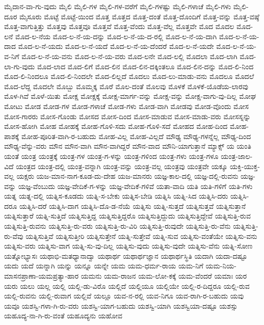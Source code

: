 {ಮೈದಾನ-ವಾ-ಗು-ವುದು
ಮೈಲಿ
ಮೈಲಿ-ಗಳ
ಮೈಲಿ-ಗಳ-ವರೆಗೆ
ಮೈಲಿ-ಗಳಷ್ಟು
ಮೈಲಿ-ಗಳಾಚೆ
ಮೈಲಿ-ಗಳು
ಮೈಲಿ-ದೂರ
ಮೈಸೂರು
ಮೊಟ್ಟೆ
ಮೊಟ್ಟೆ-ಯಿಂದ
ಮೊತ್ತ
ಮೊತ್ತದ
ಮೊತ್ತ-ದಂತೆ
ಮೊತ್ತ-ದೊಂದಿಗೆ
ಮೊತ್ತ-ವನ್ನು
ಮೊತ್ತ-ವಷ್ಠೆ
ಮೊತ್ತ-ವಾಗುತ್ತಿತ್ತು
ಮೊತ್ತವು
ಮೊತ್ತವೂ
ಮೊತ್ತವೆ
ಮೊತ್ತ-ವೆಂದು
ಮೊತ್ತ-ವೆಲ್ಲ
ಮೊತ್ತವೇ
ಮೊದ
ಮೊದಲ
ಮೊದ-ಲನೆ
ಮೊದ-ಲ-ನೆಯ
ಮೊದ-ಲ-ನೆ-ಯ-ದನ್ನು
ಮೊದ-ಲ-ನೆ-ಯ-ದ-ರಲ್ಲಿ
ಮೊದ-ಲ-ನೆ-ಯ-ದಾಗಿ
ಮೊದ-ಲ-ನೆ-ಯ-ದಾದ
ಮೊದ-ಲ-ನೆ-ಯದು
ಮೊದ-ಲ-ನೆ-ಯದೆ
ಮೊದ-ಲ-ನೆ-ಯ-ದೆಂದರೆ
ಮೊದ-ಲ-ನೆ-ಯದೇ
ಮೊದ-ಲ-ನೆ-ಯ-ವ-ನಿಗೆ
ಮೊದ-ಲ-ನೆ-ಯ-ವನು
ಮೊದ-ಲ-ನೆ-ಯ-ವರು
ಮೊದ-ಲನೇ
ಮೊದ-ಲಲ್ಲಿ
ಮೊದಲಾ
ಮೊದ-ಲಾಗಿ
ಮೊದ-ಲಾ-ಗು-ವುದು
ಮೊದ-ಲಾದ
ಮೊದ-ಲಿಗೆ
ಮೊದ-ಲಿನ
ಮೊದ-ಲಿನ-ದಕ್ಕಿಂತಲೂ
ಮೊದ-ಲಿನ-ದನ್ನು
ಮೊದ-ಲಿ-ನಿಂದ
ಮೊದ-ಲಿ-ನಿಂದಲೂ
ಮೊದ-ಲಿ-ನಿಂದಲೇ
ಮೊದ-ಲಿಲ್ಲದೆ
ಮೊದಲು
ಮೊದ-ಲು-ಮಾಡು-ವನು
ಮೊದಲೂ
ಮೊದಲೆ
ಮೊದ-ಲೆದ್ದ
ಮೊದಲೇ
ಮೊಬ್ಬು
ಮೊಮ್ಮಕ್ಕ
ಮೊರೆ
ಮೊಲ-ದಂತೆ
ಮೊಲವು
ಮೊಳಕೆ
ಮೊಳಕೆ-ಯೊಡೆಯ-ಲಾರವು
ಮೊಳ-ಗಿವೆ
ಮೊಳೆ-ಯಿತು
ಮೋಕ್ಷ
ಮೋಕ್ಷಕ್ಕೆ
ಮೋಕ್ಷ-ಮಾರ್ಗ-ವನ್ನು
ಮೋಕ್ಷ-ವನ್ನು
ಮೋಕ್ಷ-ವಾಗು-ವು-ದಿಲ್ಲ
ಮೋಘ
ಮೋಟು
ಮೋಡ
ಮೋಡ-ಗಳ
ಮೋಡ-ಗಳಾಚೆ
ಮೋಡ-ಗಳು
ಮೋಡ-ವಾಗಿ
ಮೋಡವು
ಮೋಡ-ವೊಂದು
ಮೋಸ
ಮೋಸ-ಗಾರರು
ಮೋಸ-ಗೊಂಡು
ಮೋಸದ
ಮೋಸ-ದಿಂದ
ಮೋಸ-ಮಾಡುವ
ಮೋಸ-ಮಾಡು-ವರು
ಮೋಸಸ್ನನ್ನು
ಮೋಸ-ಹೋಗಿ
ಮೋಹ
ಮೋಹಕ್ಕೆ
ಮೋಹ-ಗೊಳಿ-ಸದು
ಮೋಹ-ಗೊಳಿ-ಸದೆ
ಮೋಹದ
ಮೋಹ-ದಿಂದ
ಮೋಹ-ಪಾಶಕ್ಕೆ
ಮೋಹ-ಪೂರಿತ-ವಾಗಿ-ರ-ಬಹುದು
ಮೋಹ-ವಿಲ್ಲ
ಮೋಹ-ವಿಲ್ಲದೆ
ಮೌಢ್ಯ
ಮೌಢ್ಯ-ಗಳನ್ನೆಲ್ಲ
ಮೌಢ್ಯ-ದಿಂದ
ಮೌಢ್ಯ-ವೆನ್ನು-ವರು
ಮೌನ
ಮೌನ-ವಾಗಿ
ಮೌನ-ವಾಗಿದ್ದರೆ
ಮೌನ-ವಾದ
ಮೌನಿ-ಯಾಗುತ್ತಾನೆ
ಮ್ಯಾಕ್ಸ್
ಯ
ಯಂತಿ
ಯಂತೆ
ಯಂತ್ರ
ಯಂತ್ರಕ್ಕೆ
ಯಂತ್ರ-ಗಳ
ಯಂತ್ರ-ಗ-ಳನ್ನು
ಯಂತ್ರ-ಗಳಿಂದ
ಯಂತ್ರ-ಗಳು
ಯಂತ್ರ-ಗಳೂ
ಯಂತ್ರ-ಜಾಲ-ವಿದೆ
ಯಂತ್ರದ
ಯಂತ್ರ-ದಲ್ಲಿ
ಯಂತ್ರ-ವನ್ನಾಗಿ
ಯಂತ್ರ-ವನ್ನು
ಯಂತ್ರ-ವಲ್ಲ
ಯಂತ್ರವು
ಯಂತ್ರವೇ
ಯಕ್ಕೂ
ಯಕ್ತಿ-ಯುಕ್ತ-ವಲ್ಲ
ಯಕ್ಷರು
ಯಜ-ಮಾನ-ನಾಗ-ಕೂಡ-ದು-ದೇಹ
ಯಜ-ಮಾನರು
ಯಜ್ಞ-ಕಾಲ-ದಲ್ಲಿ
ಯಜ್ಞ-ದಲ್ಲಿ-ರುವನು
ಯಜ್ಞ-ವನ್ನು
ಯಜ್ಞ-ವೆಂಬುದು
ಯಜ್ಞ-ವೇದಿಕೆ-ಗ-ಳನ್ನು
ಯಜ್ಞ-ವೇದಿಕೆ-ಗಳಿವೆ
ಯತಾ-ವಾದಿ
ಯತಿ
ಯತಿ-ಗಳಿಗೆ
ಯತಿ-ಗಳು
ಯತ್ನ
ಯತ್ನ-ದಲ್ಲಿ
ಯತ್ನಿಸ-ಕೂಡದು
ಯತ್ನಿ-ಸ-ಬೇಕು
ಯತ್ನಿಸ-ಬೇಡಿ
ಯತ್ನಿಸಿ
ಯತ್ನಿ-ಸಿದ
ಯತ್ನಿಸಿ-ದರು
ಯತ್ನಿಸಿ-ದರೂ
ಯತ್ನಿಸಿ-ದರೆ
ಯತ್ನಿಸಿ-ದಾಗ
ಯತ್ನಿಸಿ-ದೊ-ಡ-ನೆಯೆ
ಯತ್ನಿಸು
ಯತ್ನಿ-ಸುತ್ತದೆ
ಯತ್ನಿಸುತ್ತವೆ
ಯತ್ನಿಸುತ್ತಾನೆ
ಯತ್ನಿಸುತ್ತಾರೆ
ಯತ್ನಿ-ಸುತ್ತಿದೆ
ಯತ್ನಿಸುತ್ತಿದ್ದ
ಯತ್ನಿಸುತ್ತಿದ್ದರೊ
ಯತ್ನಿಸುತ್ತಿದ್ದುದು
ಯತ್ನಿಸುತ್ತಿದ್ದೇವೆ
ಯತ್ನಿಸುತ್ತಿ-ರುವ
ಯತ್ನಿಸುತ್ತಿ-ರುವನು
ಯತ್ನಿಸುತ್ತಿ-ರು-ವರು
ಯತ್ನಿಸುತ್ತಿ-ರು-ವಿರಿ
ಯತ್ನಿಸುತ್ತಿ-ರುವುದೇ
ಯತ್ನಿಸುತ್ತಿ-ರು-ವೆನು
ಯತ್ನಿಸುತ್ತಿ-ರು-ವೆವು
ಯತ್ನಿಸುತ್ತಿವೆ
ಯತ್ನಿಸುತ್ತೀರಿ
ಯತ್ನಿಸುತ್ತೇನೆ
ಯತ್ನಿ-ಸುತ್ತೇವೆ
ಯತ್ನಿ-ಸುವ
ಯತ್ನಿಸು-ವಂತೆಯೇ
ಯತ್ನಿಸು-ವನು
ಯತ್ನಿಸು-ವರು
ಯತ್ನಿಸು-ವಾಗ
ಯತ್ನಿ-ಸು-ವು-ದಿಲ್ಲ
ಯತ್ನಿಸು-ವುದು
ಯತ್ನಿಸು-ವುದೇ
ಯತ್ನಿಸು-ವೆನು
ಯತ್ನಿ-ಸೋಣ
ಯತ್ನೋಭ್ಯಾಸಃ
ಯಥಾಭಿ-ಮತಧ್ಯಾನಾದ್ವಾ
ಯಥಾರ್ಥ
ಯಥಾರ್ಥಜ್ಞಾನ
ಯಥಾರ್ಥಸ್ಥಿತಿ
ಯದಾಗಿ
ಯದಾ-ದಷ್ಟೂ
ಯದು
ಯದೆ
ಯನ್ನಾಗಿ
ಯನ್ನು
ಯನ್ನೂ
ಯನ್ನೇ
ಯಮ
ಯಮ-ಧರ್ಮ-ರಾಯ
ಯಮ-ನಿಗೆ
ಯಮ-ನಿಯ-ಮಾಸನಪ್ರಾಣಾ-ಯಮಪ್ರತ್ಯಾ-ಹಾರ
ಯಮನು
ಯಮ-ರಾಜನ
ಯಮ-ಲೋ-ಕಕ್ಕೆ
ಯಮ-ವೆಂದರೆ
ಯಮಾಃ
ಯರ
ಯರು
ಯಲು
ಯಲ್ಲ
ಯಲ್ಲಿ
ಯಲ್ಲಿ-ಡು-ವಿರೊ
ಯಲ್ಲಿದೆ
ಯಲ್ಲಿಯೂ
ಯಲ್ಲಿಯೇ
ಯಲ್ಲಿ-ರ-ದಿದ್ದರೂ
ಯಲ್ಲಿ-ರುವ
ಯಲ್ಲಿ-ರುವನು
ಯಲ್ಲಿ-ರುವಾಗ
ಯಲ್ಲಿವೆ
ಯಲ್ಲೂ
ಯವ-ನ-ರಲ್ಲಿ
ಯವ-ನಿಗೂ
ಯವ-ರಾಗಿ-ರ-ಬಹುದು
ಯವು
ಯವೂ
ಯಶಸ್ವಿ-ಗಳಾ-ಗಿ-ರು-ವರು
ಯಶಸ್ವಿ-ಯಾಗ-ಬಹುದು
ಯಶಸ್ವಿ-ಯಾಗಿ
ಯಶಸ್ವಿಯಾ-ದಷ್ಟೂ
ಯಶಸ್ಸು
ಯಹೂದ್ಯ-ನಾ-ಗಿ-ರು-ವಂತೆ
ಯಹೂದ್ಯನು
ಯಹೋವ
}

